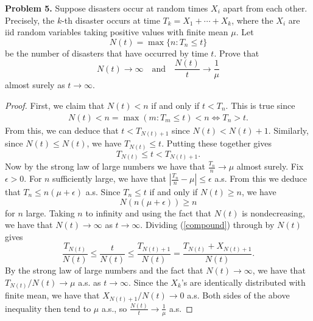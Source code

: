 \documentclass[11pt,letterpaper]{report}
\begin{document}
\noindent\textbf{Problem 5. }
Suppose disasters occur at random times $X_i$ apart from each other. Precisely, the $k$-th disaster occurs at time $T_k = X_1 + \cdots +X_k$, where the $X_i$ are iid random variables taking positive values with finite mean $\mu$. Let
\[
N(t) = \max\{n: T_n\leq t\}
\]
be the number of disasters that have occurred by time $t$. Prove that
\[
N(t)\to \infty\quad\text{and}\quad \frac{N(t)}{t}\to \frac{1}{\mu}
\]
almost surely as $t\to \infty$.
\begin{proof}
	First, we claim that $N(t)<n$ if and only if $t<T_n$. This is true since
	\begin{align*}
		N(t)<n = \max(m: T_m\leq t)<n \iff T_n > t.
	\end{align*}
	From this, we can deduce that $t<T_{N(t)+1}$ since $N(t)<N(t)+1$. Similarly, since $N(t)\leq N(t)$, we have $T_{N(t)}\leq t$. Putting these together gives
	\begin{equation}\label{compound}
		T_{N(t)}\leq t< T_{N(t)+1}.
	\end{equation}
	Now by the strong law of large numbers we have that $\frac{T_n}{n}\to \mu$ almost surely. Fix $\epsilon>0$. For $n$ sufficiently large, we have that $|\frac{T_n}{n}-\mu| \leq \epsilon$ a.s. From this we deduce that $T_n \leq n(\mu+\epsilon)$ a.s. Since $T_n\leq t$ if and only if $N(t)\geq n$, we have
	\[
	N(n(\mu+\epsilon)) \geq n
	\]
	for $n$ large. Taking $n$ to infinity and using the fact that $N(t)$ is nondecreasing, we have that $N(t)\to \infty$ as $t\to \infty$. Dividing (\ref{compound}) through by $N(t)$ gives
	\[
	\frac{T_{N(t)}}{N(t)} \leq \frac{t}{N(t)} \leq \frac{T_{N(t)+1}}{N(t)} = \frac{T_{N(t)}+X_{N(t)+1}}{N(t)}.
	\]
	By the strong law of large numbers and the fact that $N(t)\to \infty$, we have that $T_{N(t)}/N(t)\to \mu$ a.s. as $t\to \infty$. Since the $X_k$'s are identically distributed with finite mean, we have that $X_{N(t)+1}/N(t)\to 0$ a.s. Both sides of the above inequality then tend to $\mu$ a.s., so $\frac{N(t)}{t}\to \frac{1}{\mu}$ a.s.
\end{proof}
\end{document}
